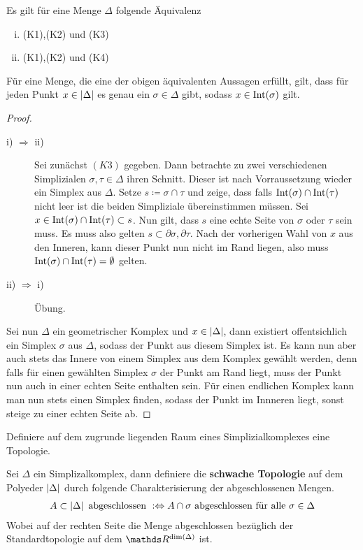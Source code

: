 \begin{Lem}\label{lem:eindeutigSimplex}
  Es gilt für eine Menge $\Delta$ folgende Äquivalenz
  \begin{enumerate}[(i)]
  \item (K1),(K2) und (K3)
  \item (K1),(K2) und (K4)
  \end{enumerate}
  Für eine Menge, die eine der obigen äquivalenten Aussagen erfüllt,
  gilt, dass für jeden Punkt $x \in \left| \Delta \right|$ es genau ein
  $\sigma \in \Delta$ gibt, sodass $x \in \operatorname{Int}(\sigma)$ gilt.
  \begin{proof}
    \begin{description}
    \item[i) $\Rightarrow$ ii)] Sei zunächst $(K3)$ gegeben. Dann
      betrachte zu zwei verschiedenen Simplizialen
      $\sigma,\tau \in \Delta$ ihren Schnitt. Dieser ist nach
      Vorraussetzung wieder ein Simplex aus $\Delta$. Setze
      $s \coloneqq \sigma \cap \tau$ und zeige, dass falls
      $\operatorname{Int}(\sigma) \cap \operatorname{Int}(\tau)$ nicht leer ist die beiden
      Simpliziale übereinstimmen müssen. Sei
      $x \in \operatorname{Int}(\sigma) \cap \operatorname{Int}(\tau) \subset s$. Nun gilt, dass
      $s$ eine echte Seite von $\sigma$ oder $\tau$ sein muss. Es muss
      also gelten $s \subset \partial\sigma , \partial\tau$. Nach der
      vorherigen Wahl von $x$ aus den Inneren, kann dieser Punkt nun
      nicht im Rand liegen, also muss
      $\operatorname{Int}(\sigma) \cap \operatorname{Int}(\tau) = \emptyset$ gelten.
      \item[ii) $\Rightarrow$ i)] Übung.
    \end{description}
    Sei nun $\Delta$ ein geometrischer Komplex und
    $x \in \left| \Delta \right|$, dann existiert offentsichlich ein Simplex
    $\sigma$ aus $\Delta$, sodass der Punkt aus diesem Simplex
    ist. Es kann nun aber auch stets das Innere von einem Simplex aus
    dem Komplex gewählt werden, denn falls für einen gewählten Simplex
    $\sigma$ der Punkt am Rand liegt, muss der Punkt nun auch in einer
    echten Seite enthalten sein. Für einen endlichen Komplex kann man
    nun stets einen Simplex finden, sodass der Punkt im Innneren
    liegt, sonst steige zu einer echten Seite ab.
  \end{proof}
\end{Lem}


Definiere auf dem zugrunde liegenden Raum eines Simplizialkomplexes eine 
Topologie.

\begin{Def}
	Sei $\Delta$ ein Simplizalkomplex, dann definiere die
	\textbf{schwache Topologie} auf dem Polyeder $\left| \Delta \right|$
	durch folgende Charakterisierung der abgeschlossenen Mengen.
	\begin{gather*}
          A \subset \left| \Delta \right| \text{ abgeschlossen }
          :\Leftrightarrow A \cap \sigma \text{ abgeschlossen für alle
          } \sigma \in \Delta
	\end{gather*}
	Wobei auf der rechten Seite die Menge abgeschlossen bezüglich der
	Standardtopologie auf dem $\R^{\dim(\Delta)}$ ist.
\end{Def}

